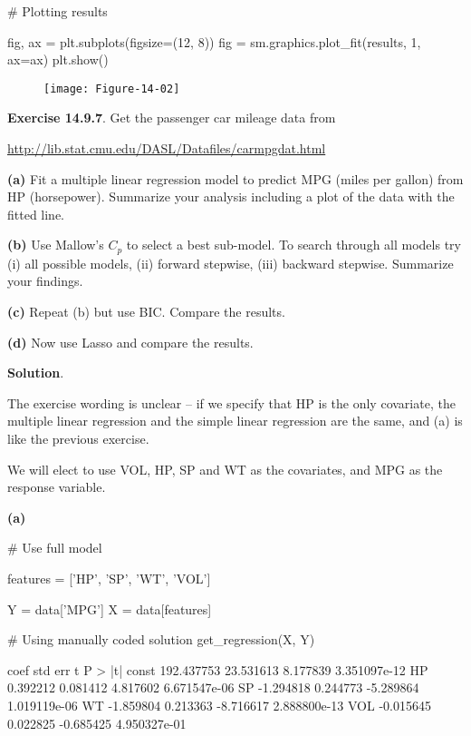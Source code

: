 \begin{python}
# Plotting results

fig, ax = plt.subplots(figsize=(12, 8))
fig = sm.graphics.plot_fit(results, 1, ax=ax)
plt.show()
\end{python}

\begin{figure}[H]
\centering
\texttt{[image: Figure-14-02]}
\end{figure}

\textbf{Exercise 14.9.7}. Get the passenger car mileage data from

\url{http://lib.stat.cmu.edu/DASL/Datafiles/carmpgdat.html}

\textbf{(a)} Fit a multiple linear regression model to predict MPG
(miles per gallon) from HP (horsepower). Summarize your analysis
including a plot of the data with the fitted line.

\textbf{(b)} Use Mallow's \(C_p\) to select a best sub-model. To search
through all models try (i) all possible models, (ii) forward stepwise,
(iii) backward stepwise. Summarize your findings.

\textbf{(c)} Repeat (b) but use BIC. Compare the results.

\textbf{(d)} Now use Lasso and compare the results.

\textbf{Solution}.

The exercise wording is unclear -- if we specify that HP is the only
covariate, the multiple linear regression and the simple linear
regression are the same, and (a) is like the previous exercise.

We will elect to use VOL, HP, SP and WT as the covariates, and MPG as
the response variable.

\textbf{(a)}

\begin{python}
# Use full model

features = ['HP', 'SP', 'WT', 'VOL']

Y = data['MPG']
X = data[features]
\end{python}

\begin{python}
# Using manually coded solution
get_regression(X, Y)
\end{python}

\begin{console}
             coef    std err         t       P > |t|
const  192.437753  23.531613  8.177839  3.351097e-12
HP       0.392212   0.081412  4.817602  6.671547e-06
SP      -1.294818   0.244773 -5.289864  1.019119e-06
WT      -1.859804   0.213363 -8.716617  2.888800e-13
VOL     -0.015645   0.022825 -0.685425  4.950327e-01
\end{console}
        
